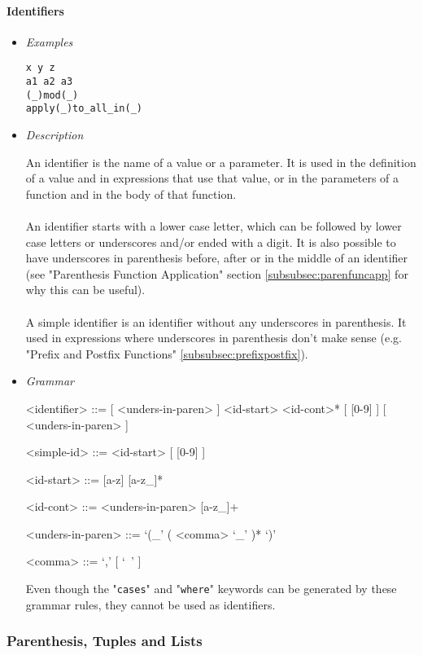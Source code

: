 \documentclass{article}
\begin{document}
\paragraph{Identifiers}
\begin{itemize}

\item \textit{Examples}
\begin{verbatim}
x y z
a1 a2 a3
(_)mod(_)
apply(_)to_all_in(_)
\end{verbatim}

\item \textit{Description}

An identifier is the name of a value or a parameter. It is used in the
definition of a value and in expressions that use that value, or in the
parameters of a function and in the body of that function.
\\\\
An identifier starts with a lower case letter, which can be followed by lower
case letters or underscores and/or ended with a digit. It is also possible to
have underscores in parenthesis before, after or in the middle of an identifier
(see "Parenthesis Function Application" section \ref{subsubsec:parenfuncapp}
for why this can be useful).
\\\\
A simple identifier is an identifier without any underscores in parenthesis.
It used in expressions where underscores in parenthesis don't make sense (e.g.
"Prefix and Postfix Functions" \ref{subsubsec:prefixpostfix}).

\item \textit{Grammar}
\begin{grammar}
<identifier> ::=
[ <unders-in-paren> ] <id-start> <id-cont>* [ [0-9] ] [ <unders-in-paren> ]

<simple-id> ::= <id-start> [ [0-9] ]

<id-start> ::= [a-z] [a-z_]*

<id-cont> ::= <unders-in-paren> [a-z_]+

<unders-in-paren> ::= `(_' ( <comma> `_' )* `)'

<comma> ::= `,' [ `\ ' ]
\end{grammar}
Even though the "\verb|cases|" and "\verb|where|" keywords can be generated
by these grammar rules, they cannot be used as identifiers.

\end{itemize}

\newpage
\subsubsection{Parenthesis, Tuples and Lists}
\end{document}
